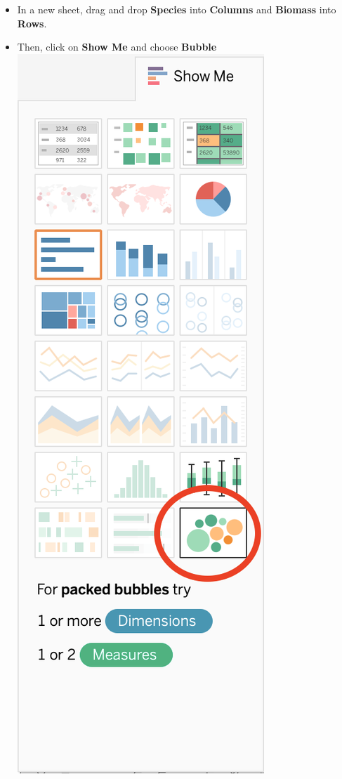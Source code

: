 \documentclass[
]{book}
\providecommand{\tightlist}{%
  \setlength{\itemsep}{0pt}\setlength{\parskip}{0pt}}
\begin{document}
\begin{enumerate}
  \begin{itemize}
  \tightlist
  \item
    In a new sheet, drag and drop \textbf{Species} into \textbf{Columns} and \textbf{Biomass} into \textbf{Rows}.
  \item
    Then, click on \textbf{Show Me} and choose \textbf{Bubble}
    \includegraphics{images/M3S2_show-me-bubble-plot.png}

\end{itemize}
\end{enumerate}
\end{document}
